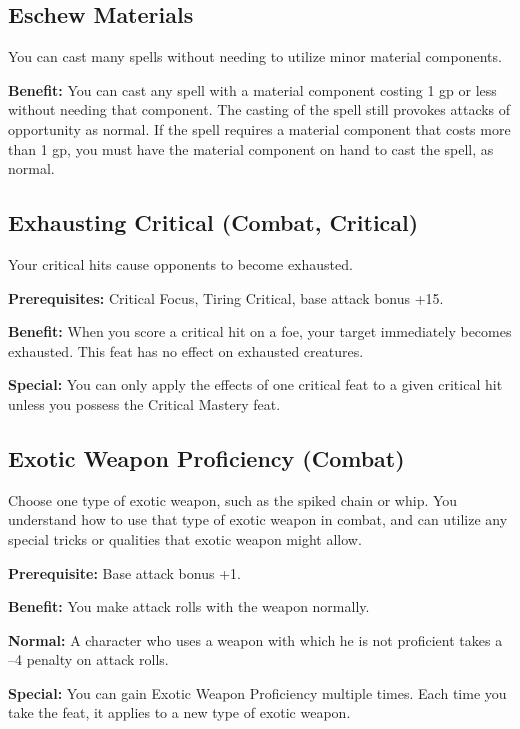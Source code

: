 \subsection{Eschew Materials}

				
You can cast many spells without needing to utilize minor material components.
				
\textbf{Benefit:} You can cast any spell with a material component costing 1 gp or less without needing that component. The casting of the spell still provokes attacks of opportunity as normal. If the spell requires a material component that costs more than 1 gp, you must have the material component on hand to cast the spell, as normal.
				
\subsection{Exhausting Critical (Combat, Critical)}

				
Your critical hits cause opponents to become exhausted.
				
\textbf{Prerequisites:} Critical Focus, Tiring Critical, base attack bonus +15.
				
\textbf{Benefit:} When you score a critical hit on a foe, your target immediately becomes exhausted. This feat has no effect on exhausted creatures.
				
\textbf{Special:} You can only apply the effects of one critical feat to a given critical hit unless you possess the Critical Mastery feat.
				
\subsection{Exotic Weapon Proficiency (Combat)}

				
Choose one type of exotic weapon, such as the spiked chain or whip. You understand how to use that type of exotic weapon in combat, and can utilize any special tricks or qualities that exotic weapon might allow.
				
\textbf{Prerequisite:} Base attack bonus +1.
				
\textbf{Benefit:} You make attack rolls with the weapon normally.
				
\textbf{Normal:} A character who uses a weapon with which he is not proficient takes a --4 penalty on attack rolls.
				
\textbf{Special:} You can gain Exotic Weapon Proficiency multiple times. Each time you take the feat, it applies to a new type of exotic weapon. 
				
